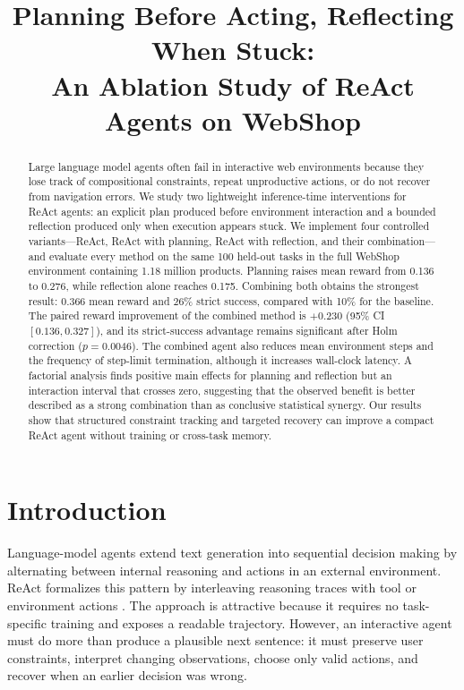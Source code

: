 \documentclass{article}
\title{Planning Before Acting, Reflecting When Stuck:\\
An Ablation Study of ReAct Agents on WebShop}
\author{}
\begin{document}
\maketitle

\begin{abstract}
Large language model agents often fail in interactive web environments because they lose track of compositional constraints, repeat unproductive actions, or do not recover from navigation errors. We study two lightweight inference-time interventions for ReAct agents: an explicit plan produced before environment interaction and a bounded reflection produced only when execution appears stuck. We implement four controlled variants---ReAct, ReAct with planning, ReAct with reflection, and their combination---and evaluate every method on the same 100 held-out tasks in the full WebShop environment containing 1.18 million products. Planning raises mean reward from 0.136 to 0.276, while reflection alone reaches 0.175. Combining both obtains the strongest result: 0.366 mean reward and 26\% strict success, compared with 10\% for the baseline. The paired reward improvement of the combined method is $+0.230$ (95\% CI $[0.136, 0.327]$), and its strict-success advantage remains significant after Holm correction ($p=0.0046$). The combined agent also reduces mean environment steps and the frequency of step-limit termination, although it increases wall-clock latency. A factorial analysis finds positive main effects for planning and reflection but an interaction interval that crosses zero, suggesting that the observed benefit is better described as a strong combination than as conclusive statistical synergy. Our results show that structured constraint tracking and targeted recovery can improve a compact ReAct agent without training or cross-task memory.
\end{abstract}

\section{Introduction}

Language-model agents extend text generation into sequential decision making by alternating between internal reasoning and actions in an external environment. ReAct formalizes this pattern by interleaving reasoning traces with tool or environment actions \citep{yao2023react}. The approach is attractive because it requires no task-specific training and exposes a readable trajectory. However, an interactive agent must do more than produce a plausible next sentence: it must preserve user constraints, interpret changing observations, choose only valid actions, and recover when an earlier decision was wrong.
\end{document}
